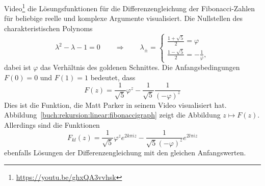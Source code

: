 %
%
%
Video\footnote{\url{https://youtu.be/ghxQA3vvhsk}} die Lösungsfunktionen
für die Differenzengleichung der Fibonacci-Zahlen für beliebige
reelle und komplexe Argumente visualisiert.
Die Nullstellen des charakteristischen Polynoms
\[
\lambda^2-\lambda-1=0
\qquad
\Rightarrow
\qquad
\lambda_\pm = \begin{cases}
\displaystyle
\frac{1+\sqrt{5}}{2}=\varphi
\\[8pt]
\displaystyle
\frac{1-\sqrt{5}}{2}=-\frac{1}{\varphi},
\end{cases}
\]
dabei ist $\varphi$ das Verhältnis des goldenen Schnittes.
%
%
Die Anfangsbedingungen $F(0)=0$ und $F(1)=1$ bedeutet, dass
\begin{equation}
F(z) = \frac{1}{\sqrt{5}}\varphi^z - \frac{1}{\sqrt{5}}\frac{1}{(-\varphi)^z}
\label{buch:rekursion:linear:fibonaccifunktion}
\end{equation}
Dies ist die Funktion, die Matt Parker in seinem Video visualisiert hat.
Abbildung~\eqref{buch:rekursion:linear:fibonaccigraph} zeigt die Abbildung
$z\mapsto F(z)$.
Allerdings sind die Funktionen
\[
F_{kl}(z)
=
\frac{1}{\sqrt{5}}
\varphi^ze^{2k\pi iz}
-
\frac{1}{\sqrt{5}(-\varphi)^z} e^{2l\pi iz}
\]
ebenfalls Lösungen der Differenzengleichung mit den gleichen 
Anfangswerten.



